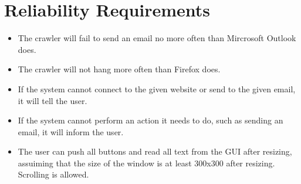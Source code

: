 \section{Reliability Requirements}
\begin{itemize}
\item The crawler will fail to send an email no more often than Mircrosoft Outlook does.
\item The crawler will not hang more often than Firefox does.
\item If the system cannot connect to the given website or send to the given email, it will tell the user.
\item If the system cannot perform an action it needs to do, such as sending an email, it will inform the user.
\item The user can push all buttons and read all text from the GUI after resizing, assuiming that the size of the window is at least 300x300 after resizing. Scrolling is allowed.
\end{itemize}
